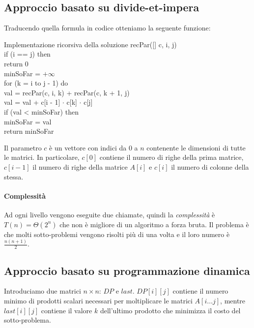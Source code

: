 \subsection{Approccio basato su divide-et-impera}
Traducendo quella formula in codice otteniamo la seguente funzione:

\begin{minicode}{Implementazione ricorsiva della soluzione}
\ind{} recPar([] c,  i,  j)\\
    \indf if (i == j) then\\
        return 0\\
    \indf{} minSoFar = $+\infty$\\
        \indff for (k = i to j - 1) do\\
             val = recPar(c, i, k) + recPar(c, k + 1, j)\\
            val = val + c[i - 1] $\cdot$ c[k] $\cdot$ c[j]\\
            \indfff if (val < minSoFar) then\\
                minSoFar = val\\
    \indf return minSoFar
\end{minicode}\noindent
Il parametro $c$ è un vettore con indici da $0$ a $n$ contenente le dimensioni di
tutte le matrici. In particolare, $c[0]$ contiene il numero di righe della
prima matrice, $c[i-1]$ il numero di righe della matrice $A[i]$ e $c[i]$ il numero
di colonne della stessa.

\paragraph{Complessità}
Ad ogni livello vengono eseguite due chiamate, quindi la \emph{complessità} è
$T(n)=\Theta(2^n)$ che non è migliore di un algoritmo a forza bruta. Il
problema è che molti sotto-problemi vengono risolti più di una volta e il loro
numero è $\frac{n(n+1)}{2}$.

\subsection{Approccio basato su programmazione dinamica}
Introduciamo due matrici $n\times n$: $DP$ e $last$. $DP[i][j]$ contiene il
numero minimo di prodotti scalari necessari per moltiplicare le matrici
$A[i\dots j]$, mentre $last[i][j]$ contiene il valore $k$ dell'ultimo prodotto
che minimizza il costo del sotto-problema.

